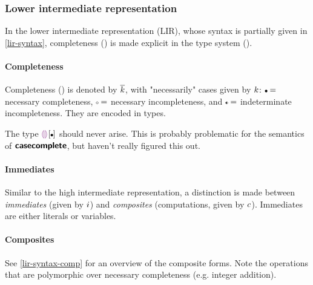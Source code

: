 \documentclass[index.tex]{subfiles}
\begin{document}
\newcommand{\ETrue}{\ensuremath{\SyTrue}}
\newcommand{\EAnd}[2]{\ensuremath{#1 \SyAnd #2}}
\newcommand{\EOr}[2]{\ensuremath{#1 \SyOr #2}}

\newcommand{\EPair}[2]{\ensuremath{(#1, #2)}}
\newcommand{\EProjL}[1]{\ensuremath{\SyProjL~ #1}}
\newcommand{\EProjR}[1]{\ensuremath{\SyProjR~ #1}}

\newcommand{\EEHole}[2]{\ensuremath{\SyEHole{#1}{#2}}}

\newcommand{\EVarNamed}[2]{\ensuremath{t_{#1}^{{\color{gray}#2}}}}

\subsubsection{Lower intermediate representation}
In the lower intermediate representation (LIR), whose syntax is partially given in
\cref{lir-syntax}, completeness () is made explicit in the type system
().

\paragraph{Completeness}
Completeness () is denoted by $\overline{k}$, with "necessarily" cases given
by $k$: $\CNC =$ necessary completeness, $\CNI =$ necessary incompleteness, and
$\CII =$ indeterminate incompleteness. They are encoded in types.
%
\begin{note}
  The type $\TMk{\TCHole}{\CNC}$ should never arise. This is probably problematic for the semantics
  of $\textsf{\textbf{casecomplete}}$, but haven't really figured this out.
\end{note}

\paragraph{Immediates}
Similar to the high intermediate representation, a distinction is made between \emph{immediates}
(given by $i$) and \emph{composites} (computations, given by $c$). Immediates
are either literals or variables.

\paragraph{Composites}
See \cref{lir-syntax-comp} for an overview of the composite forms. Note the operations that are
polymorphic over necessary completeness (e.g. integer addition).
\end{document}

